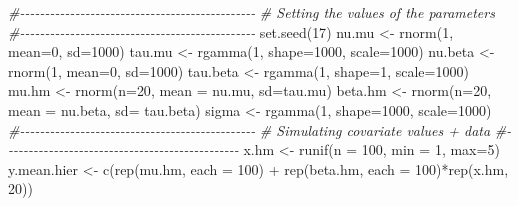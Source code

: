 \documentclass[
]{article}
\newenvironment{Shaded}{\begin{snugshade}}{\end{snugshade}}
\newcommand{\AttributeTok}[1]{\textcolor[rgb]{0.77,0.63,0.00}{#1}}
\newcommand{\CommentTok}[1]{\textcolor[rgb]{0.56,0.35,0.01}{\textit{#1}}}
\newcommand{\DecValTok}[1]{\textcolor[rgb]{0.00,0.00,0.81}{#1}}
\newcommand{\FunctionTok}[1]{\textcolor[rgb]{0.00,0.00,0.00}{#1}}
\newcommand{\NormalTok}[1]{#1}
\newcommand{\OtherTok}[1]{\textcolor[rgb]{0.56,0.35,0.01}{#1}}
\newcommand{\SpecialCharTok}[1]{\textcolor[rgb]{0.00,0.00,0.00}{#1}}
\begin{document}
\begin{Shaded}
\begin{Highlighting}[]
\CommentTok{\#{-}{-}{-}{-}{-}{-}{-}{-}{-}{-}{-}{-}{-}{-}{-}{-}{-}{-}{-}{-}{-}{-}{-}{-}{-}{-}{-}{-}{-}{-}{-}{-}{-}{-}{-}{-}{-}{-}{-}{-}{-}{-}{-}{-}{-}{-}{-}}
\CommentTok{\# Setting the values of the parameters}
\CommentTok{\#{-}{-}{-}{-}{-}{-}{-}{-}{-}{-}{-}{-}{-}{-}{-}{-}{-}{-}{-}{-}{-}{-}{-}{-}{-}{-}{-}{-}{-}{-}{-}{-}{-}{-}{-}{-}{-}{-}{-}{-}{-}{-}{-}{-}{-}{-}{-}}
\FunctionTok{set.seed}\NormalTok{(}\DecValTok{17}\NormalTok{)}
\NormalTok{nu.mu }\OtherTok{\textless{}{-}} \FunctionTok{rnorm}\NormalTok{(}\DecValTok{1}\NormalTok{, }\AttributeTok{mean=}\DecValTok{0}\NormalTok{, }\AttributeTok{sd=}\DecValTok{1000}\NormalTok{)}
\NormalTok{tau.mu }\OtherTok{\textless{}{-}} \FunctionTok{rgamma}\NormalTok{(}\DecValTok{1}\NormalTok{, }\AttributeTok{shape=}\DecValTok{1000}\NormalTok{, }\AttributeTok{scale=}\DecValTok{1000}\NormalTok{)}
\NormalTok{nu.beta }\OtherTok{\textless{}{-}} \FunctionTok{rnorm}\NormalTok{(}\DecValTok{1}\NormalTok{, }\AttributeTok{mean=}\DecValTok{0}\NormalTok{, }\AttributeTok{sd=}\DecValTok{1000}\NormalTok{)}
\NormalTok{tau.beta }\OtherTok{\textless{}{-}} \FunctionTok{rgamma}\NormalTok{(}\DecValTok{1}\NormalTok{, }\AttributeTok{shape=}\DecValTok{1}\NormalTok{, }\AttributeTok{scale=}\DecValTok{1000}\NormalTok{)}
\NormalTok{mu.hm }\OtherTok{\textless{}{-}} \FunctionTok{rnorm}\NormalTok{(}\AttributeTok{n=}\DecValTok{20}\NormalTok{, }\AttributeTok{mean =}\NormalTok{ nu.mu, }\AttributeTok{sd=}\NormalTok{tau.mu)}
\NormalTok{beta.hm }\OtherTok{\textless{}{-}} \FunctionTok{rnorm}\NormalTok{(}\AttributeTok{n=}\DecValTok{20}\NormalTok{, }\AttributeTok{mean =}\NormalTok{ nu.beta, }\AttributeTok{sd=}\NormalTok{ tau.beta)}
\NormalTok{sigma }\OtherTok{\textless{}{-}} \FunctionTok{rgamma}\NormalTok{(}\DecValTok{1}\NormalTok{, }\AttributeTok{shape=}\DecValTok{1000}\NormalTok{, }\AttributeTok{scale=}\DecValTok{1000}\NormalTok{)}
\CommentTok{\#{-}{-}{-}{-}{-}{-}{-}{-}{-}{-}{-}{-}{-}{-}{-}{-}{-}{-}{-}{-}{-}{-}{-}{-}{-}{-}{-}{-}{-}{-}{-}{-}{-}{-}{-}{-}{-}{-}{-}{-}{-}{-}{-}{-}{-}{-}{-}}
\CommentTok{\# Simulating covariate values + data}
\CommentTok{\#{-}{-}{-}{-}{-}{-}{-}{-}{-}{-}{-}{-}{-}{-}{-}{-}{-}{-}{-}{-}{-}{-}{-}{-}{-}{-}{-}{-}{-}{-}{-}{-}{-}{-}{-}{-}{-}{-}{-}{-}{-}{-}{-}{-}{-}{-}{-}}
\NormalTok{x.hm }\OtherTok{\textless{}{-}} \FunctionTok{runif}\NormalTok{(}\AttributeTok{n =} \DecValTok{100}\NormalTok{, }\AttributeTok{min =} \DecValTok{1}\NormalTok{, }\AttributeTok{max=}\DecValTok{5}\NormalTok{)}
\NormalTok{y.mean.hier }\OtherTok{\textless{}{-}} \FunctionTok{c}\NormalTok{(}\FunctionTok{rep}\NormalTok{(mu.hm, }\AttributeTok{each =} \DecValTok{100}\NormalTok{) }\SpecialCharTok{+} 
                   \FunctionTok{rep}\NormalTok{(beta.hm, }\AttributeTok{each =} \DecValTok{100}\NormalTok{)}\SpecialCharTok{*}\FunctionTok{rep}\NormalTok{(x.hm, }\DecValTok{20}\NormalTok{))}


\end{Highlighting}
\end{Shaded}
\end{document}
